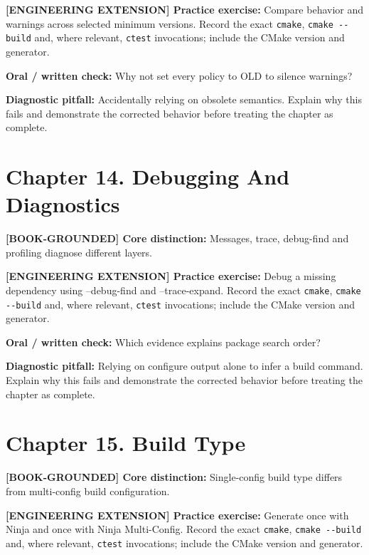 \documentclass[11pt,letterpaper,oneside]{report}
\providecommand{\passthrough}[1]{#1}
\begin{document}
\textbf{{[}ENGINEERING EXTENSION{]} Practice exercise:} Compare behavior
and warnings across selected minimum versions. Record the exact
\passthrough{\lstinline!cmake!}, \passthrough{\lstinline!cmake --build!}
and, where relevant, \passthrough{\lstinline!ctest!} invocations;
include the CMake version and generator.

\textbf{Oral / written check:} Why not set every policy to OLD to
silence warnings?

\textbf{Diagnostic pitfall:} Accidentally relying on obsolete semantics.
Explain why this fails and demonstrate the corrected behavior before
treating the chapter as complete.

\section{Chapter 14. Debugging And
Diagnostics}\label{chapter-14.-debugging-and-diagnostics}

\textbf{{[}BOOK-GROUNDED{]} Core distinction:} Messages, trace,
debug-find and profiling diagnose different layers.

\textbf{{[}ENGINEERING EXTENSION{]} Practice exercise:} Debug a missing
dependency using --debug-find and --trace-expand. Record the exact
\passthrough{\lstinline!cmake!}, \passthrough{\lstinline!cmake --build!}
and, where relevant, \passthrough{\lstinline!ctest!} invocations;
include the CMake version and generator.

\textbf{Oral / written check:} Which evidence explains package search
order?

\textbf{Diagnostic pitfall:} Relying on configure output alone to infer
a build command. Explain why this fails and demonstrate the corrected
behavior before treating the chapter as complete.

\section{Chapter 15. Build Type}\label{chapter-15.-build-type}

\textbf{{[}BOOK-GROUNDED{]} Core distinction:} Single-config build type
differs from multi-config build configuration.

\textbf{{[}ENGINEERING EXTENSION{]} Practice exercise:} Generate once
with Ninja and once with Ninja Multi-Config. Record the exact
\passthrough{\lstinline!cmake!}, \passthrough{\lstinline!cmake --build!}
and, where relevant, \passthrough{\lstinline!ctest!} invocations;
include the CMake version and generator.
\end{document}
